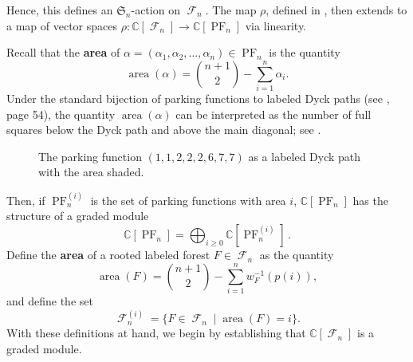\documentclass{amsart}
\renewcommand{\S}{\mathfrak{S}}
\newcommand{\CC}{\mathbb{C}}
\newcommand{\eqpd}{\, .}
\DeclareMathOperator{\area}{area}
\DeclareMathOperator{\PF}{PF}
\newcommand{\defterm}{\textbf}
\DeclareMathOperator{\F}{\mathcal{F}}
\theoremstyle{definition}
\begin{document}
Hence, this defines an $\S_n$-action on $\F_n$.  The map $\rho$, defined in , then extends to a map of vector spaces $\rho:\CC[\F_n]\to \CC[\PF_n]$ via linearity.
    
    

    Recall that the \defterm{area} of  $\alpha=(\alpha_1,\alpha_2,\ldots,\alpha_n)\in \PF_n$ is the quantity
    \[\area(\alpha)=\binom{n+1}{2}-\sum_{i=1}^n\alpha_i.\]
    Under the standard bijection of parking functions to labeled Dyck paths (see \cite{YanPFs}, page 54), the quantity $\area(\alpha)$ can be interpreted as the number of full squares below the Dyck path and above the main diagonal; see .
\begin{figure}[htb]\centering
{}

\caption{The parking function $(1,1,2,2,2,6,7,7)$ as a labeled Dyck path with the area shaded.}
\label{fig:area_example_dyck_path}
\end{figure}



    Then, if $\PF^{(i)}_{n}$ is the set of parking functions with area $i$, $\CC[\PF_n]$ has the structure of a graded module
    \[\CC[\PF_n]=\bigoplus_{i\geq 0}\CC[\PF^{(i)}_{n}] \eqpd \]
    Define the \defterm{area} of a rooted labeled forest $F\in \F_n$ as the quantity
    \[\area(F)=\binom{n+1}{2}-\sum_{i=1}^n w^{-1}_F(p(i)),\]
 and define the set
   \[\F_n^{(i)}=\{F\in \F_n\mid \area(F)=i\}.\]
With these definitions at hand, we begin by establishing that $\CC[\F_n]$ is a graded module.
\end{document}
